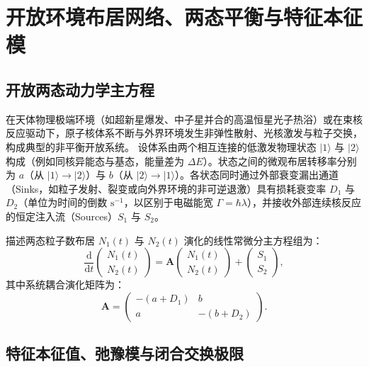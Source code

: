 \section{开放环境布居网络、两态平衡与特征本征模}\label{sec:appD-open-network}

\subsection{开放两态动力学主方程}

在天体物理极端环境（如超新星爆发、中子星并合的高温恒星光子热浴）或在束核反应驱动下，原子核体系不断与外界环境发生非弹性散射、光核激发与粒子交换，构成典型的非平衡开放系统。
设体系由两个相互连接的低激发物理状态 $|1\rangle$ 与 $|2\rangle$ 构成（例如同核异能态与基态，能量差为 $\Delta E$）。状态之间的微观布居转移率分别为 $a$（从 $|1\rangle \to |2\rangle$）与 $b$（从 $|2\rangle \to |1\rangle$）。各状态同时通过外部衰变漏出通道（Sinks，如粒子发射、裂变或向外界环境的非可逆退激）具有损耗衰变率 $D_1$ 与 $D_2$（单位为时间的倒数 $\mathrm{s}^{-1}$，以区别于电磁能宽 $\Gamma = \hbar \lambda$），并接收外部连续核反应的恒定注入流（Sources）$S_1$ 与 $S_2$。

描述两态粒子数布居 $N_1(t)$ 与 $N_2(t)$ 演化的线性常微分主方程组为：
\begin{equation}\label{eq:appD-master-eq-2state}
\frac{\mathrm{d}}{\mathrm{d}t} \begin{pmatrix} N_1(t) \\ N_2(t) \end{pmatrix} = \mathbf{A} \begin{pmatrix} N_1(t) \\ N_2(t) \end{pmatrix} + \begin{pmatrix} S_1 \\ S_2 \end{pmatrix},
\end{equation}
其中系统耦合演化矩阵为：
\begin{equation}\label{eq:appD-coupling-matrix}
\mathbf{A} = \begin{pmatrix} -(a + D_1) & b \\ a & -(b + D_2) \end{pmatrix}.
\end{equation}

\subsection{特征本征值、弛豫模与闭合交换极限}

